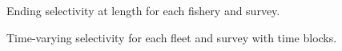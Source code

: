 \documentclass[
]{scrartcl}
\begin{document}
\begin{figure}[H]


\caption{\label{fig-sel-all}Ending selectivity at length for each
fishery and survey.}

\end{figure}%

\begin{figure}[H]


\caption{\label{fig-sel-tv-comp}Time-varying selectivity for each fleet
and survey with time blocks.}

\end{figure}%
\end{document}

